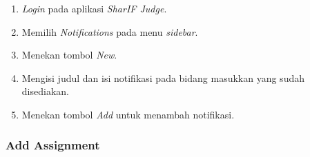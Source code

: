 \begin{enumerate}
	\item \textit{Login} pada aplikasi \textit{SharIF Judge}.
	\item Memilih \textit{Notifications} pada menu \textit{sidebar}.
	\item Menekan tombol \textit{New}.
	\item Mengisi judul dan isi notifikasi pada bidang masukkan yang sudah disediakan.
	\item Menekan tombol \textit{Add} untuk menambah notifikasi.
\end{enumerate}

\subsubsection{Add Assignment}
